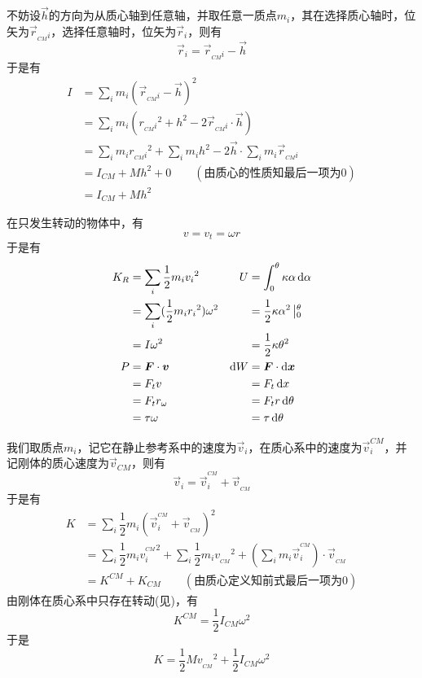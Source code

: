 \newpage
\begin{prove}[\itr{Parallel Axis Theorem}{平行轴定理}\qquad$I=I_{CM}+Mh^2$]
	不妨设$\vec{h}$的方向为从质心轴到任意轴，并取任意一质点$m_i$，其在选择质心轴时，位矢为$\vec{r}_{_{CM}i}$，选择任意轴时，位矢为$\vec{r}_i$，则有\[\vec{r}_i=\vec{r}_{_{CM}i}-\vec{h}\]
	于是有
	\begin{align*}
		I&=\sum_{i}m_i(\vec{r}_{_{CM}i}-\vec{h})^2\\
		&=\sum_{i}m_i(r_{_{CM}i}{}^2+h^2-2\vec{r}_{_{CM}i}\cdot\vec{h})\\
		&=\sum_{i}m_ir_{_{CM}i}{}^2+\sum_{i}m_ih^2-2\vec{h}\cdot\sum_{i}m_i\vec{r}_{_{CM}i}\\
		&=I_{CM}+Mh^2+0\qquad(\text{由质心的性质知最后一项为0})\\
		&=I_{CM}+Mh^2
	\end{align*}
\end{prove}
\begin{prove}
	在只发生转动的物体中，有\[v=v_t=\omega r\]于是有
	\begin{align*}
		K_R&=\sum_i\dfrac{1}{2}m_iv_i{}^2&U&=\int_0^{\theta}\kappa\alpha\dif\alpha\\
		&=\sum_i(\dfrac{1}{2}m_i r_i{}^2)\omega^2&&=\dfrac{1}{2}\kappa\alpha^2\left|_0^{\theta}\right.\\
		&=I\omega^2&&=\dfrac{1}{2}\kappa\theta^2\\
		P&=\vec{F}\cdot \vec{v}&\dif W&=\vec{F}\cdot\dif \vec{x}\\
		&=F_tv&&=F_t\dif x\\
		&=F_tr_\omega&&=F_tr\dif\theta\\
		&=\tau\omega&&=\tau\dif\theta
	\end{align*}
\end{prove}
\begin{prove}[\itr{Konig's Theorem}{柯尼希定理}\qquad$K=K_{CM}+K^{CM}$]
	我们取质点$m_i$，记它在静止参考系中的速度为$\vec{v}_i$，在质心系中的速度为$\vec{v}^{CM}_i$，并记刚体的质心速度为$\vec{v}_{CM}$，则有
	\[\vec{v}_i=\vec{v}_i^{^{CM}}+\vec{v}_{_{CM}}\]
	于是有
	\begin{align*}
		K&=\sum_i\dfrac{1}{2}m_i(\vec{v}_i^{^{CM}}+\vec{v}_{_{CM}})^2\\
		&=\sum_i\dfrac{1}{2}m_i{v_i^{^{CM}}}^2+\sum_i\dfrac{1}{2}m_i{v_{_{CM}}}^2+(\sum_im_i\vec{v}_i^{^{CM}})\cdot\vec{v}_{_{CM}}\\
		&=K^{CM}+K_{CM}\qquad(\text{由质心定义知前式最后一项为0})
	\end{align*}
	由刚体在质心系中只存在转动(见)，有
	\[K^{CM}=\dfrac{1}{2}I_{CM}\omega^2\]
	于是
	\[K=\dfrac{1}{2}M{v_{_{CM}}}^2+\dfrac{1}{2}I_{CM}\omega^2\]
\end{prove}

